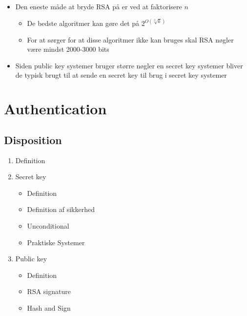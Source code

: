 \documentclass[a4, english]{article}
\begin{document}
\begin{itemize}
\begin{itemize}
  \end{itemize}
  \item Den eneste måde at bryde RSA på er ved at faktorisere $n$ 
  \begin{itemize}
  	\item De bedste algoritmer kan gøre det på $2^{O(\sqrt[3]k)}$
    \item For at sørger for at disse algoritmer ikke kan bruges skal RSA nøgler være mindst 2000-3000 bits
  \end{itemize}
  \item Siden public key systemer bruger større nøgler en secret key systemer bliver de typisk brugt til at sende en secret key til brug i secret key systemer
\end{itemize}

\newpage

\section{Authentication}
\subsection{Disposition}
\begin{enumerate}
	\item Definition
  \item Secret key
  \begin{itemize}
  	\item Definition
    \item Definition af sikkerhed
    \item Unconditional 
    \item Praktiske Systemer
  \end{itemize}  
  \item Public key
  \begin{itemize}
  	\item Definition
    \item RSA signature
    \item Hash and Sign
  \end{itemize}
\end{enumerate}
\newpage
\end{document}
